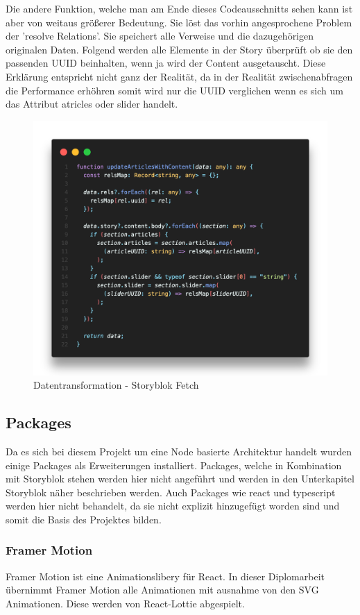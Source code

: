 Die andere Funktion, welche man am Ende dieses Codeausschnitts sehen kann ist aber von weitaus größerer Bedeutung. Sie löst das vorhin angesprochene Problem der 'resolve Relations'. Sie speichert alle Verweise und die dazugehörigen originalen Daten. Folgend werden alle Elemente in der Story überprüft ob sie den passenden UUID beinhalten, wenn ja wird der Content ausgetauscht. Diese Erklärung entspricht nicht ganz der Realität, da in der Realität zwischenabfragen die Performance erhöhren somit wird nur die UUID verglichen wenn es sich um das Attribut atricles oder slider handelt.
\begin{figure}[H]
    \centering
    \includegraphics[width=\linewidth]{pics/sb-fetch-02.png}
    \caption{Datentransformation - Storyblok Fetch}
\end{figure}


\subsection{Packages}
Da es sich bei diesem Projekt um eine Node basierte Architektur handelt wurden einige Packages als Erweiterungen installiert. 
Packages, welche in Kombination mit Storyblok stehen werden hier nicht angeführt und werden in den Unterkapitel Storyblok näher beschrieben werden. Auch Packages wie react und typescript werden hier nicht behandelt, da sie nicht explizit hinzugefügt worden sind und somit die Basis des Projektes bilden.

\subsubsection*{Framer Motion}
Framer Motion ist eine Animationslibery für React. In dieser Diplomarbeit übernimmt Framer Motion alle Animationen mit ausnahme von den SVG Animationen. Diese werden von React-Lottie abgespielt.

